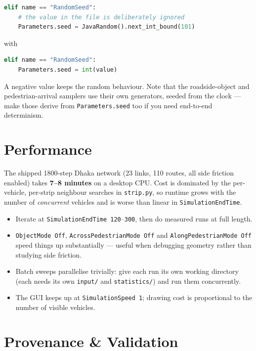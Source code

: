 \documentclass[11pt, a4paper]{article}
\newcommand{\code}[1]{\texttt{#1}}
\begin{document}
\begin{lstlisting}[language=Python]
elif name == "RandomSeed":
    # the value in the file is deliberately ignored
    Parameters.seed = JavaRandom().next_int_bound(101)
\end{lstlisting}

with

\begin{lstlisting}[language=Python]
elif name == "RandomSeed":
    Parameters.seed = int(value)
\end{lstlisting}

A negative value keeps the random behaviour. Note that the roadside-object and
pedestrian-arrival samplers use their own generators, seeded from the clock ---
make those derive from \code{Parameters.seed} too if you need end-to-end
determinism.

\section{Performance}

The shipped 1800-step Dhaka network (23 links, 110 routes, all side friction
enabled) takes \textbf{7--8 minutes} on a desktop CPU. Cost is dominated by the
per-vehicle, per-strip neighbour searches in \code{strip.py}, so runtime grows
with the number of \emph{concurrent} vehicles and is worse than linear in
\code{SimulationEndTime}.

\begin{itemize}
    \item Iterate at \code{SimulationEndTime 120}--\code{300}, then do measured
          runs at full length.
    \item \code{ObjectMode Off}, \code{AcrossPedestrianMode Off} and
          \code{AlongPedestrianMode Off} speed things up substantially --- useful
          when debugging geometry rather than studying side friction.
    \item Batch sweeps parallelise trivially: give each run its own working
          directory (each needs its own \code{input/} and \code{statistics/}) and
          run them concurrently.
    \item The GUI keeps up at \code{SimulationSpeed 1}; drawing cost is
          proportional to the number of visible vehicles.
\end{itemize}

\section{Provenance \& Validation}
\label{sec:provenance}
\end{document}
